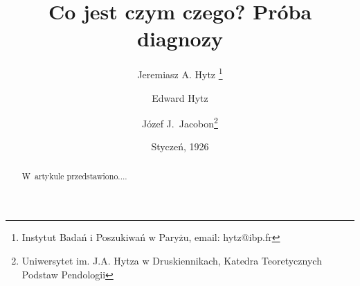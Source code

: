 \documentclass[a4paper]{article}
\title{Co jest czym czego? Próba diagnozy}
\author{Jeremiasz A. Hytz \thanks{Instytut Badań i Poszukiwań w Paryżu, 
email: hytz@ibp.fr} \and Edward Hytz 
 \and Józef J.~Jacobon\thanks{Uniwersytet im. J.A. Hytza 
w Druskiennikach, Katedra Teoretycznych Podstaw Pendologii}}
\date{Styczeń, 1926}
\begin{document}
\maketitle
\begin{abstract}W~artykule przedstawiono.... \end{abstract}
\end{document}
